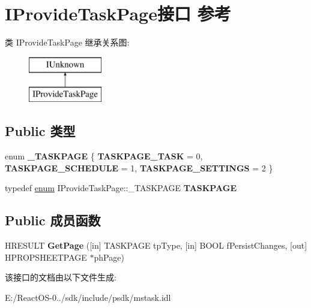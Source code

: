 \hypertarget{interface_i_provide_task_page}{}\section{I\+Provide\+Task\+Page接口 参考}
\label{interface_i_provide_task_page}
类 I\+Provide\+Task\+Page 继承关系图\+:\begin{figure}[H]
\begin{center}
\leavevmode
\includegraphics[height=2.000000cm]{interface_i_provide_task_page}
\end{center}
\end{figure}
\subsection*{Public 类型}
\begin{DoxyCompactItemize}
\item 
\mbox{\label{interface_i_provide_task_page_aa688e686cbb5f9c066f58390a5fbb404}} 
enum {\bfseries \+\_\+\+T\+A\+S\+K\+P\+A\+GE} \{ {\bfseries T\+A\+S\+K\+P\+A\+G\+E\+\_\+\+T\+A\+SK} = 0, 
{\bfseries T\+A\+S\+K\+P\+A\+G\+E\+\_\+\+S\+C\+H\+E\+D\+U\+LE} = 1, 
{\bfseries T\+A\+S\+K\+P\+A\+G\+E\+\_\+\+S\+E\+T\+T\+I\+N\+GS} = 2
 \}
\item 
\mbox{\label{interface_i_provide_task_page_a6abf913e96f9a60bb179ae2f38903481}} 
typedef \hyperlink{interfaceenum}{enum} I\+Provide\+Task\+Page\+::\+\_\+\+T\+A\+S\+K\+P\+A\+GE {\bfseries T\+A\+S\+K\+P\+A\+GE}
\end{DoxyCompactItemize}
\subsection*{Public 成员函数}
\begin{DoxyCompactItemize}
\item 
\mbox{\label{interface_i_provide_task_page_ad26ae46667cb148720c31f6d361069ff}} 
H\+R\+E\+S\+U\+LT {\bfseries Get\+Page} (\mbox{[}in\mbox{]} T\+A\+S\+K\+P\+A\+GE tp\+Type, \mbox{[}in\mbox{]} B\+O\+OL f\+Persist\+Changes, \mbox{[}out\mbox{]} H\+P\+R\+O\+P\+S\+H\+E\+E\+T\+P\+A\+GE $\ast$ph\+Page)
\end{DoxyCompactItemize}


该接口的文档由以下文件生成\+:\begin{DoxyCompactItemize}
\item 
E\+:/\+React\+O\+S-\/0../sdk/include/psdk/mstask.\+idl\end{DoxyCompactItemize}
